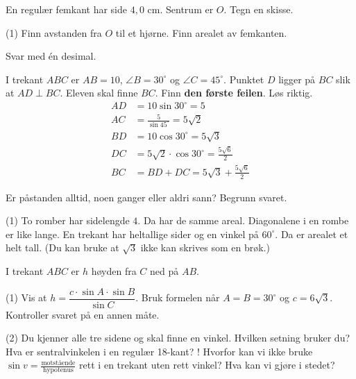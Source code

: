 En regulær femkant har side $4,0$ cm. Sentrum er $O$. Tegn en skisse.
\begin{tasks}(1)
  \task Finn avstanden fra $O$ til et hjørne.
  \task Finn arealet av femkanten.
\end{tasks}
Svar med én desimal.

I trekant $ABC$ er $AB = 10$, $\angle B = 30^\circ$ og $\angle C = 45^\circ$. Punktet $D$ ligger på $BC$ slik at $AD \perp BC$. Eleven skal finne $BC$. Finn \textbf{den første feilen}. Løs riktig.
\[ \begin{aligned}
AD &= 10 \sin 30^\circ = 5\\
AC &= \frac{5}{\sin 45^\circ} = 5\sqrt2\\
BD &= 10 \cos 30^\circ = 5\sqrt3\\
DC &= 5\sqrt2 \cdot \cos 30^\circ = \tfrac{5\sqrt6}{2}\\
BC &= BD + DC = 5\sqrt3 + \tfrac{5\sqrt6}{2}
\end{aligned} \]


Er påstanden alltid, noen ganger eller aldri sann? Begrunn svaret.
\begin{tasks}(1)
  \task To romber har sidelengde $4$. Da har de samme areal.
  \task Diagonalene i en rombe er like lange.
  \task En trekant har heltallige sider og en vinkel på $60^\circ$. Da er arealet et helt tall. (Du kan bruke at $\sqrt3$ ikke kan skrives som en brøk.)
\end{tasks}

I trekant $ABC$ er $h$ høyden fra $C$ ned på $AB$.
\begin{tasks}(1)
  \task Vis at $h = \dfrac{c \cdot \sin A \cdot \sin B}{\sin C}$.
  \task Bruk formelen når $A = B = 30^\circ$ og $c = 6\sqrt3$. Kontroller svaret på en annen måte.
\end{tasks}

\begin{sjekk}
\begin{tasks}(2)
  \task Du kjenner alle tre sidene og skal finne en vinkel. Hvilken setning bruker du?
  \task Hva er sentralvinkelen i en regulær 18-kant?
  \task! Hvorfor kan vi ikke bruke $\sin v = \frac{\text{motstående}}{\text{hypotenus}}$ rett i en trekant uten rett vinkel? Hva kan vi gjøre i stedet?
\end{tasks}
\end{sjekk}


